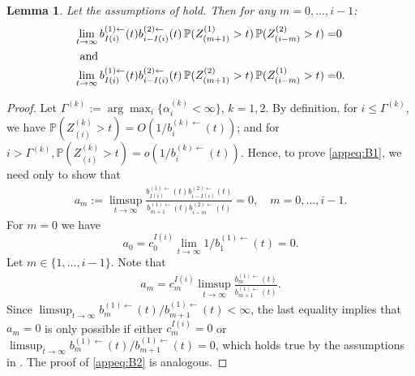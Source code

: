 \documentclass[aos]{imsart}
\numberwithin{equation}{section}
\theoremstyle{plain} %
\newtheorem{lemma}[theorem]{Lemma}
\theoremstyle{remark}
\newcommand{\beao}{\begin{eqnarray*}}
\newcommand{\eeao}{\end{eqnarray*}\noindent}
\renewcommand\P{\mathbb{P}}
\begin{document}
\begin{lemma} \label{Lemma 4.2}
Let the assumptions of  hold. Then for any
$m=0,\ldots,i-1$:
\begin{align}
    \lim_{t\to\infty}b_{I(i)}^{(1)\leftarrow}(t)b_{i-I(i)}^{(2)\leftarrow}(t)\,\P(Z_{(m+1)}^{(1)}>t)\,\P(Z_{(i-m)}^{(2)}>t)=& 0 \label{appeq:B1}\\ \intertext{ and }
   { \lim_{t\to\infty}b_{I(i)}^{(1)\leftarrow}(t)b_{i-I(i)}^{(2)\leftarrow}(t)\,\P(Z_{(m+1)}^{(2)}>t)\,\P(Z_{(i-m)}^{(1)}>t)}=& 0. \label{appeq:B2}
\end{align}
\end{lemma}
\begin{proof}

Let $\Gamma^{(k)}:=\arg\max_i\{\alpha_i^{(k)}<\infty\}$, $k=1, 2$. By definition, for $i\le \Gamma^{(k)}$, we have $\P(Z_{(i)}^{(k)}>t) =O( 1/b_i^{(k)\leftarrow}(t))$; and for $i>\Gamma^{(k)}, \P(Z_{(i)}^{(k)}>t) = o(1/b_i^{(k)\leftarrow}(t))$. Hence, to prove \eqref{appeq:B1}, we need only to show that 
\beao
    a_m:=\limsup_{t\to\infty}\frac{b_{I(i)}^{(1)\leftarrow}(t)b_{i-I(i)}^{(2)\leftarrow}(t)}{b_{m+1}^{(1)\leftarrow}(t)b_{i-m}^{(2)\leftarrow}(t)}=0, \quad m=0,\ldots,i-1.
\eeao
For $m=0$ we have
$$a_0=c_0^{I(i)}\lim_{t\to\infty}1/b^{(1)\leftarrow}_1(t)=0.$$
Let $ m\in\{1,\ldots,i-1\}$.
Note that
\beao
        a_{m}%
        =c_{m}^{I(i)}\limsup_{t\to\infty}\frac{b_{m}^{(1)\leftarrow}(t)}{b_{m+1}^{(1)\leftarrow}(t)}.
\eeao
Since $\limsup_{t\to\infty}b_{m}^{(1)\leftarrow}(t)/b_{m+1}^{(1)\leftarrow}(t)<\infty$, the last equality implies that  $a_m=0$ is only possible if either $c_m^{I(i)}=0$ or $\limsup_{t\to\infty}b_{m}^{(1)\leftarrow}(t)/b_{m+1}^{(1)\leftarrow}(t)=0$, which holds true by the assumptions in .
The proof of \eqref{appeq:B2} is analogous.
\end{proof}
\end{document}
